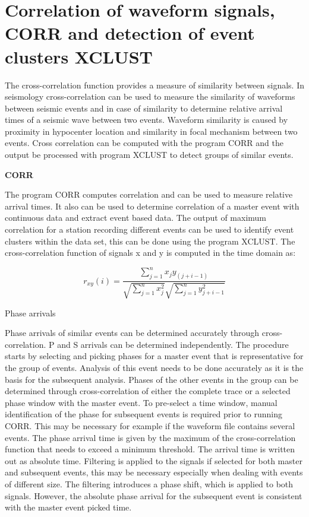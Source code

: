 
\section{Correlation of waveform signals, CORR and detection of event clusters XCLUST}

The cross-correlation function provides a measure of similarity between signals. 
In seismology cross-correlation can be used to measure the similarity 
of waveforms between seismic events and in case of similarity to determine relative arrival times of a seismic wave between two events. Waveform similarity is caused by proximity in hypocenter location and similarity in focal mechanism between two events. Cross correlation can be computed with the program CORR and the output be processed with program XCLUST to detect groups of similar events. 

\textbf{CORR}

The program CORR computes correlation and can be used to measure relative arrival times. It also can be used to determine correlation of a master event with continuous data and extract event based data. The output of maximum correlation for a station recording different events can be used to identify event clusters within the data set, this can be done using the program XCLUST.  
The cross-correlation function of signals x and y is computed in the time domain as: 

\begin{displaymath}
r_{xy}(i) = \frac{\sum_{j=1}^{n} x_j y_{(j+i-1)}}
{\sqrt{\sum_{j=1}^{n} x_j^2} \sqrt{\sum_{j=1}^{n} y_{j+i-1}^2}}
\end{displaymath}

Phase arrivals 

Phase arrivals of similar events can be determined accurately through cross-correlation. P and S arrivals can be determined independently. The procedure starts by selecting and picking phases for a master event that is representative for the group of events. Analysis of this event needs to be done accurately as it is the basis for the subsequent analysis. Phases of the other events in the group can be determined through cross-correlation of either the complete trace or a selected phase window with the master event. To pre-select a time window, manual identification of the phase for subsequent events is required prior to running CORR. This may be necessary for example if the waveform file contains several events. The phase arrival time is given by the maximum of the cross-correlation function that needs to exceed a minimum threshold. The arrival time is written out as absolute time. Filtering is applied to the signals if selected for both master and subsequent events, this may be necessary especially when dealing with events of different size. The filtering introduces a phase shift, which is applied to both signals. However, the absolute phase arrival for the subsequent event is consistent with the master event picked time. 

